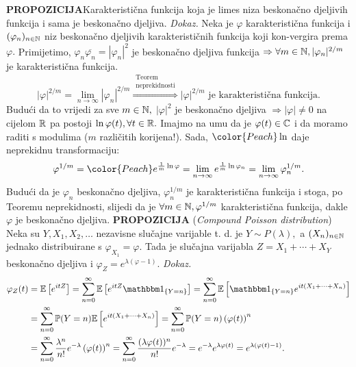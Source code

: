 \documentclass{article}
\begin{document}
\textbf{PROPOZICIJA}\newline Karakteristična funkcija koja je limes niza beskonačno djeljivih funkcija i sama je beskonačno djeljiva.\newline\newline
\textit{Dokaz.}\newline
Neka je \(\varphi\) karakteristična funkcija i \((\varphi_n)_{n\in\Bbb N}\) niz beskonačno djeljivih karakterističnih funkcija koji kon-\newline vergira prema \(\varphi.\) Primijetimo, \(\varphi_n\overline{\varphi_n}=|\varphi_n|^2\) je beskonačno djeljiva funkcija \(\Rightarrow\forall m\in\Bbb N,|\varphi_n|^{2/m}\) je karakteristična funkcija. \[|\varphi|^{2/m}=\lim_{n\to\infty}|\varphi_n|^{2/m}\overset{\substack{\text{Teorem}\\\text{neprekidnosti}}}{\Rightarrow}|\varphi|^{2/m}\text{ je karakteristična funkcija}.\] Budući da to vrijedi za sve \(m\in\Bbb N,\) \(|\varphi|^2\) je beskonačno djeljiva \(\Rightarrow|\varphi|\ne 0\) na cijelom \(\Bbb R\)
 pa postoji \(\ln\varphi(t),\forall t\in\Bbb R.\) Imajmo na umu da je \(\varphi(t)\in\Bbb C\) i da moramo raditi s modulima (\(m\) različitih korijena!). Sada, \(\color{Peach}\ln\) daje \textcolor{Peach}{neprekidnu} transformaciju: \[\varphi^{1/m}={\color{Peach}e^{\frac1m\ln\varphi}=\lim_{n\to\infty}e^{\frac1m\ln\varphi_n}}=\lim_{n\to\infty}\varphi_n^{1/m}.\] Budući da je \(\varphi_n\) beskonačno djeljiva, \(\varphi_n^{1/m}\) je karakteristična funkcija i stoga, po Teoremu neprekidnosti, slijedi da je \(\forall m\in\Bbb N,\varphi^{1/m}\) karakteristična funkcija, dakle \(\varphi\) je beskonačno djeljiva.\newline\newline
 \textbf{PROPOZICIJA} (\emph{Compound Poisson distribution})\newline
 Neka su \(Y,X_1,X_2,\ldots\) nezavisne slučajne varijable t. d. je \(Y\sim P(\lambda),\) a \((X_n)_{n\in\Bbb N}\) jednako distribuirane s \(\varphi_{X_1}=\varphi.\) Tada je slučajna varijabla \(Z=X_1+\cdots+X_Y\) beskonačno djeljiva i \(\varphi_Z=e^{\lambda(\varphi-1)}.\)\newline\newline
 \textit{Dokaz.} \[\begin{aligned}\varphi_Z(t)&=\Bbb E\left[e^{itZ}\right]=\sum_{n=0}^\infty\Bbb E\left[e^{itZ}\mathbbm 1_{\{Y=n\}}\right]=\sum_{n=0}^\infty\Bbb E\left[\mathbbm 1_{\{Y=n\}}e^{it(X_1+\cdots+X_n)}\right]\\&=\sum_{n=0}^\infty\Bbb P(Y=n)\Bbb E\left[e^{it(X_1+\cdots+X_n)}\right]=\sum_{n=0}^\infty\Bbb P(Y=n)\left(\varphi(t)\right)^n\\&=\sum_{n=0}^\infty\frac{\lambda^n}{n!}e^{-\lambda}\left(\varphi(t)\right)^n=\sum_{n=0}^\infty\frac{(\lambda\varphi(t))^n}{n!}e^{-\lambda}=e^{-\lambda}e^{\lambda\varphi(t)}=e^{\lambda(\varphi(t)-1)}.\end{aligned}\]
\end{document}
